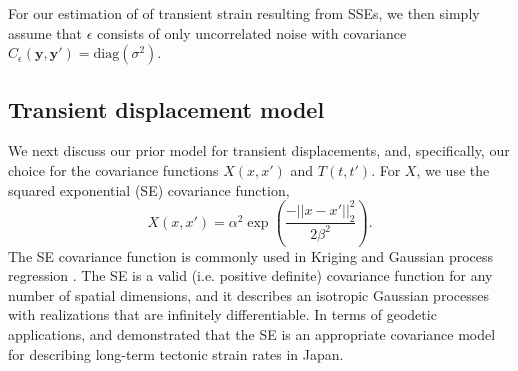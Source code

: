 \documentclass[10pt,a4paper]{article}
\begin{document}
For our estimation of of transient strain resulting from SSEs, we then simply assume that $\epsilon$ consists of only uncorrelated noise with covariance $C_\epsilon(\bm{y},\bm{y}') = \mathrm{diag}(\sigma^2)$.            

\subsection{Transient displacement model}
We next discuss our prior model for transient displacements, and, specifically, our choice for the covariance functions $X(x,x')$ and $T(t,t')$. For $X$, we use the squared exponential (SE) covariance function,
\begin{equation}\label{eq:SE}
X(x,x') = \alpha^2 \exp\left(\frac{-||x - x'||_2^2}{2 \beta^2}\right).
\end{equation}
The SE covariance function is commonly used in Kriging \citep[e.g,][]{Cressie1992} and Gaussian process regression \citep[e.g.,][]{Rasmussen2006}.  The SE is a valid (i.e. positive definite) covariance function for any number of spatial dimensions, and it describes an isotropic Gaussian processes with realizations that are infinitely differentiable. In terms of geodetic applications, \citet{Kato1998} and \cite{El-Fiky1999} demonstrated that the SE is an appropriate covariance model for describing long-term tectonic strain rates in Japan.  
\end{document}

